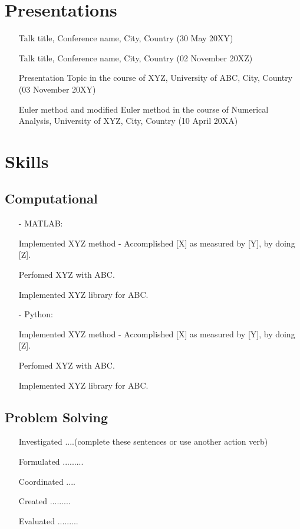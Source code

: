 \documentclass[11pt]{article}
\begin{document}
    \section{Presentations}
    \begin{itemize}
        \item[\checkmark] Talk title, Conference name, City, Country (30 May 20XY)
        \item[\checkmark] Talk title, Conference name, City, Country (02 November 20XZ)
        \item[\checkmark] Presentation Topic in the course of XYZ, University of ABC, City, Country (03 November 20XY)
        \item[\checkmark] Euler method and modified Euler method in the course of Numerical Analysis, University of XYZ, City, Country (10 April 20XA)
    \end{itemize}
    \section{Skills}
    \subsection{Computational}
    \begin{itemize}
        \item[-] \textcolor{Sepia}{MATLAB}:
        \item[\checkmark] Implemented XYZ method - Accomplished [X] as measured by [Y], by doing [Z].  
        \item[\checkmark] Perfomed XYZ with ABC. 
        \item[\checkmark] Implemented XYZ library for ABC. 
        \item[-] \textcolor{Sepia}{Python}: 
        \item[\checkmark] Implemented XYZ method - Accomplished [X] as measured by [Y], by doing [Z].  
        \item[\checkmark] Perfomed XYZ with ABC. 
        \item[\checkmark] Implemented XYZ library for ABC.
    \end{itemize}
    \subsection{Problem Solving}
    \begin{itemize}
        \item[\checkmark] Investigated ....(complete these sentences or use another action verb)
        \item[\checkmark] Formulated .........
        \item[\checkmark] Coordinated ....
        \item[\checkmark] Created .........
        \item[\checkmark] Evaluated .........
    \end{itemize}
\end{document}
